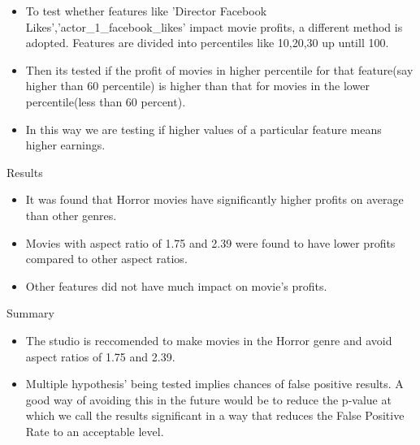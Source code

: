 \documentclass{beamer}
\begin{document}
\begin{frame}

\begin{tcolorbox}[colback=purple!5,colframe=blue!75!black,title=Testing Feature's Impact on Profit]
\begin{itemize}
\item To test whether features like 'Director Facebook Likes','actor\_1\_facebook\_likes' impact movie profits, a different method is adopted. Features are divided into percentiles like 10,20,30 up untill 100.

\item Then its tested if the profit of movies in higher percentile for that feature(say higher than 60 percentile) is higher than that for movies in the lower percentile(less than 60 percent).

\item In this way we are testing if higher values of a particular feature means higher earnings.
\end{itemize}
\end{tcolorbox}	
\end{frame}
\begin{frame}{Results}
\begin{itemize}
\item It was found that Horror movies have significantly higher profits on average than other genres.

\item Movies with aspect ratio of 1.75 and 2.39 were found to have lower profits compared to other aspect ratios.

\item Other features did not have much impact on movie's profits.
\end{itemize}

\end{frame}
\begin{frame}{Summary}
\begin{itemize}
\item The studio is reccomended to make movies in the Horror genre and avoid aspect ratios of 1.75 and 2.39.
\item Multiple hypothesis' being tested implies chances of false positive results. A good way of avoiding this in the future would be to reduce the p-value at which we call the results significant in a way that reduces the False Positive Rate to an acceptable level. 
\end{itemize}
\nocite{fpr} 
\end{frame}
\begin{frame}
\printbibliography

\end{frame}
\end{document}
